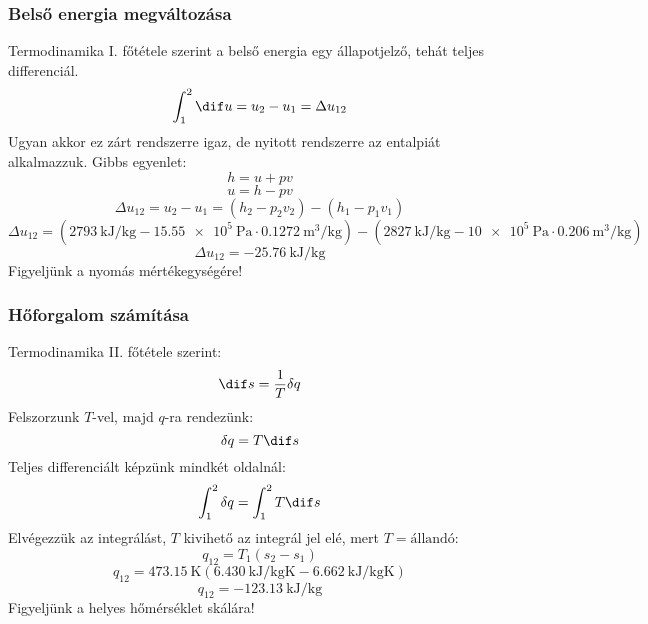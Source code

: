 		\subsubsection{Belső energia megváltozása}
			Termodinamika I. főtétele szerint a belső energia egy állapotjelző, tehát teljes differenciál.
			\[ \int_{1}^{2} \dif u = u_2 - u_1 = \Delta u_{12}
			\]  
			Ugyan akkor ez zárt rendszerre igaz, de nyitott rendszerre az entalpiát alkalmazzuk. Gibbs egyenlet:
			\[ h=u+pv\]  
			\[u=h-pv\] 
			\begin{equation*}
				\Delta u_{12} = u_2 - u_1 = \left(h_2 -p_2  v_2\right) - \left(h_1 -p_1  v_1\right) 				 
			\end{equation*}
			\begin{equation}
				\Delta u_{12} = \left( \SI{2793}{\kilo\joule\per\kilogram} - \SI{15,55e5}{\pascal} \cdot \SI{0,1272}{\meter\cubed\per\kilogram} \right) - \left( \SI{2827}{\kilo\joule\per\kilogram} - \SI{10e5}{\pascal} \cdot \SI{0,206}{\meter\cubed\per\kilogram} \right) 
			\end{equation}
			\begin{equation}
				\Delta u_{12} = \SI{-25,76}{\kilo\joule\per\kilogram} 
			\end{equation}
                                Figyeljünk a nyomás mértékegységére!
		\subsubsection{Hőforgalom számítása}
			Termodinamika II. főtétele szerint:
			\[ \dif s=\dfrac {1}{T} \delta q\] 
			Felszorzunk $T$-vel, majd $q$-ra rendezünk:
			\[ \delta q=T\dif s \]
			Teljes differenciált képzünk mindkét oldalnál:
			\[\int_{1}^{2} \delta q = \int_{1}^{2} T\dif s \]
                                Elvégezzük az integrálást, $T$ kivihető az integrál jel elé, mert $T=\text{állandó}$:
			\begin{equation*}
				q_{12} = T_1\left( s_2 - s_1\right) 
			\end{equation*}   
			\begin{equation}
				q_{12} = \SI{473,15}{\kelvin} \left( \SI{6,430}{\kilo\joule\per\kilogram\kelvin} -\SI{6,662}{\kilo\joule\per\kilogram\kelvin}   \right) 
			\end{equation}
			\begin{equation}
				q_{12} = \SI{-123,13}{\kilo\joule\per\kilogram}
			\end{equation}	
                                 Figyeljünk a helyes hőmérséklet skálára!
